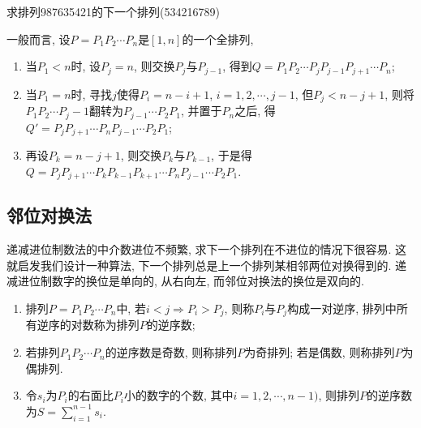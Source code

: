             \begin{example}
                求排列987635421的下一个排列(534216789)
            \end{example}

        \begin{algorithm}
            [在递减进制中求一个排列的下一个排列的算法]
            一般而言, 设$P=P_1P_2\cdots P_n$是$[1,n]$的一个全排列,
            \begin{enumerate}
                \item 当$P_1<n$时, 设$P_j=n$, 则交换$P_j$与$P_{j-1}$, 得到$Q=P_1P_2\cdots P_jP_{j-1}P_{j+1}\cdots P_n$;
                \item 当$P_1=n$时, 寻找$j$使得$P_i=n-i+1$, $i=1,2,\cdots,j-1$, 但$P_j<n-j+1$, 则将$P_1P_2\cdots P_j-1$翻转为$P_{j-1}\cdots P_2P_1$, 并置于$P_n$之后, 得$Q'=P_jP_{j+1}\cdots P_nP_{j-1}\cdots P_2P_1$;
                \item 再设$P_k=n-j+1$, 则交换$P_k$与$P_{k-1}$, 于是得$Q=P_jP_{j+1}\cdots P_kP_{k-1}P_{k+1}\cdots P_nP_{j-1}\cdots P_2P_1$.
            \end{enumerate}
        \end{algorithm}
    
    \subsection{邻位对换法}

        递减进位制数法的中介数进位不频繁, 求下一个排列在不进位的情况下很容易. 这就启发我们设计一种算法, 下一个排列总是上一个排列某相邻两位对换得到的. 递减进位制数字的换位是单向的, 从右向左, 而邻位对换法的换位是双向的. 
    
        \begin{definition}
            \begin{enumerate}
                \item 排列$P=P_1P_2\cdots P_n$中, 若$i<j\Rightarrow P_i>P_j$, 则称$P_i$与$P_j$构成一对\textsf{逆序}, 排列中所有逆序的对数称为排列$P$的\textsf{逆序数};
                \item 若排列$P_1P_2\cdots P_n$的逆序数是奇数, 则称排列$P$为\textsf{奇排列}; 若是偶数, 则称排列$P$为\textsf{偶排列}. 
                \item 令$s_i$为$P_i$的右面比$P_i$小的数字的个数, 其中$i=1,2,\cdots,n-1)$, 则排列$P$的逆序数为$S=\sum_{i=1}^{n-1}s_i$.
            \end{enumerate}
        \end{definition}

